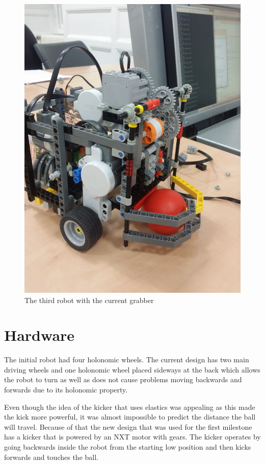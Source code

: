 \documentclass[12pt]{article}
\begin{document}
\begin{figure}
	~
	\begin{minipage}[b]{.48\textwidth}
        \centering
		\includegraphics[scale=.065,angle=-90]{robot2.jpg}
		\caption{The third robot with the current grabber}
		\label{fig:robot2}
	\end{minipage}
\end{figure}


\section{Hardware}

The initial robot had four holonomic wheels. The current design has two main
driving wheels and one holonomic wheel placed sideways at the back which allows
the robot to turn as well as does not cause problems moving backwards and
forwards due to its holonomic property.

Even though the idea of the kicker that uses elastics was appealing as this made
the kick more powerful, it was almost impossible to predict the distance the
ball will travel.
Because of that the new design that was used for the first milestone has a
kicker that is powered by an NXT motor with gears. The kicker operates by going backwards inside the robot from the starting low position and then kicks
forwards and touches the ball.
\end{document}
